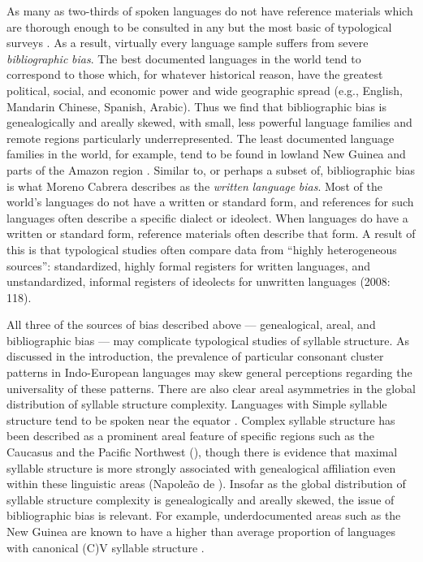   As many as two-thirds of spoken languages do not have reference materials which are thorough enough to be consulted in any but the most basic of typological surveys \citep[106]{Bakker2011}. As a result, virtually every language sample suffers from severe \textit{bibliographic} \textit{bias}. The best documented languages in the world tend to correspond to those which, for whatever historical reason, have the greatest political, social, and economic power and wide geographic spread (e.g., English, Mandarin Chinese, Spanish, Arabic). Thus we find that bibliographic bias is genealogically and areally skewed, with small, less powerful language families and remote regions particularly underrepresented. The least documented language families in the world, for example, tend to be found in lowland New Guinea and parts of the Amazon region \citep{Hammarström2010}. Similar to, or perhaps a subset of, bibliographic bias is what Moreno Cabrera describes as the \textit{written} \textit{language} \textit{bias}. Most of the world’s languages do not have a written or standard form, and references for such languages often describe a specific dialect or ideolect. When languages do have a written or standard form, reference materials often describe that form. A result of this is that typological studies often compare data from “highly heterogeneous sources”: standardized, highly formal registers for written languages, and unstandardized, informal registers of ideolects for unwritten languages (2008: 118).



  All three of the sources of bias described above — genealogical, areal, and bibliographic bias — may complicate typological studies of syllable structure. As discussed in the introduction, the prevalence of particular consonant cluster patterns in Indo-European languages may skew general perceptions regarding the universality of these patterns. There are also clear areal asymmetries in the global distribution of syllable structure complexity. Languages with Simple syllable structure tend to be spoken near the equator \citep{Maddieson2013a}. Complex syllable structure has been described as a prominent areal feature of specific regions such as the Caucasus \citep{Chirikba2008} and the Pacific Northwest (\citealt{ThompsonKinkade1990}), though there is evidence that maximal syllable structure is more strongly associated with genealogical affiliation even within these linguistic areas (Napoleão de \citealt{Souza2017}). Insofar as the global distribution of syllable structure complexity is genealogically and areally skewed, the issue of bibliographic bias is relevant. For example, underdocumented areas such as the New Guinea are known to have a higher than average proportion of languages with canonical (C)V syllable structure \citep{Maddieson2013a}.



